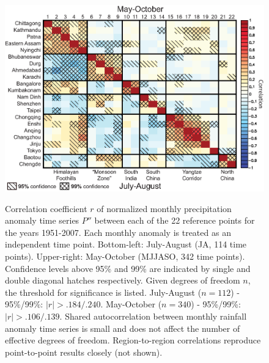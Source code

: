 \begin{figure}[t]
  \noindent\includegraphics[width=36pc,angle=0]{Figures/ch2/fig3correl}\\
  \caption{Correlation coefficient $r$ of normalized monthly precipitation anomaly time series $P''$ between each of the 22 reference points for the years 1951-2007. Each monthly anomaly is treated as an independent time point. Bottom-left: July-August (JA, 114 time points). Upper-right: May-October (MJJASO, 342 time points). Confidence levels above 95\% and 99\% are indicated by single and double diagonal hatches respectively. Given degrees of freedom $n$, the threshold for significance is listed. July-August ($n=112$) - 95\%/99\%: $\lvert r\rvert >.184/.240$. May-October ($n=340$) - 95\%/99\%: $\lvert r\rvert>.106/.139$. Shared autocorrelation between monthly rainfall anomaly time series is small and does not affect the number of effective degrees of freedom. Region-to-region correlations reproduce point-to-point results closely (not shown).}
\label{fig:f23}
\end{figure}

